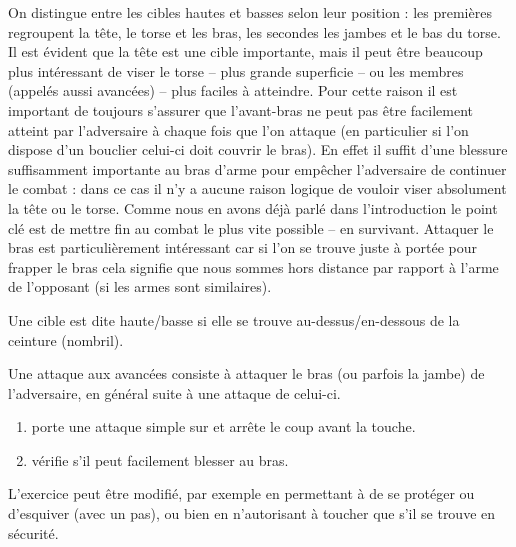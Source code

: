 On distingue entre les cibles hautes et basses selon leur position : les premières regroupent la tête, le torse et les bras, les secondes les jambes et le bas du torse.
Il est évident que la tête est une cible importante, mais il peut être beaucoup plus intéressant de viser le torse -- plus grande superficie -- ou les membres (appelés aussi avancées) -- plus faciles à atteindre.
Pour cette raison il est important de toujours s'assurer que l'avant-bras ne peut pas être facilement atteint par l'adversaire à chaque fois que l'on attaque (en particulier si l'on dispose d'un bouclier celui-ci doit couvrir le bras).
En effet il suffit d'une blessure suffisamment importante au bras d'arme pour empêcher l'adversaire de continuer le combat : dans ce cas il n'y a aucune raison logique de vouloir viser absolument la tête ou le torse.
Comme nous en avons déjà parlé dans l'introduction le point clé est de mettre fin au combat le plus vite possible -- en survivant.
Attaquer le bras est particulièrement intéressant car si l'on se trouve juste à portée pour frapper le bras cela signifie que nous sommes hors distance par rapport à l'arme de l'opposant (si les armes sont similaires).


\begin{definition}

Une cible est dite haute/basse si elle se trouve au-dessus/en-dessous de la ceinture (nombril).
\end{definition}


\begin{coup}

Une attaque aux avancées consiste à attaquer le bras (ou parfois la jambe) de l'adversaire, en général suite à une attaque de celui-ci.

\end{coup}


\begin{exercice}

\begin{enumerate}
	\item \A porte une attaque simple sur \D et arrête le coup avant la touche.
	
	\item \D vérifie s'il peut facilement blesser \A au bras.
\end{enumerate}

L'exercice peut être modifié, par exemple en permettant à \D de se protéger ou d'esquiver (avec un pas), ou bien en n'autorisant \D à toucher \A que s'il se trouve en sécurité.
\end{exercice}


